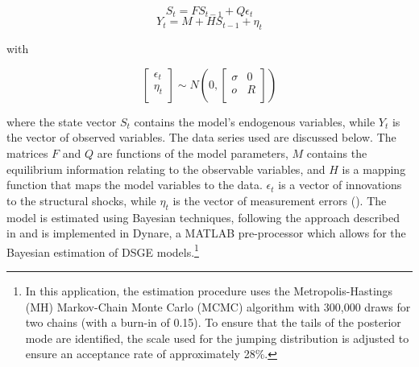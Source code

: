 \documentclass[a4paper,11pt]{article}
\numberwithin{equation}{section}
\begin{document}
	\begin{equation}
	S_t=FS_{t-1}+Q\epsilon_t
	\end{equation}
	\begin{equation}
	Y_t=M+HS_{t-1}+\eta_t
	\end{equation}
	
	with 
	
	\begin{equation} \label{measurement}
	\begin{bmatrix}
	\epsilon_t\\
	\eta_t\\
	\end{bmatrix}
	\sim
	N\left(
	0,
	\begin{bmatrix}
		\sigma & 0\\
		o & R\\
	\end{bmatrix}
	\right)
	\end{equation}
	
	where the state vector $S_t$ contains the model's endogenous variables, while $Y_t$ is the vector of observed variables. The data series used are discussed below. The matrices $F$ and $Q$ are functions of the model parameters, $M$ contains the equilibrium information relating to the observable variables, and $H$ is a mapping function that maps the model variables to the data. $\epsilon_t$ is a vector of innovations to the structural shocks, while $\eta_t$ is the vector of measurement errors (\citealp{steinbach2014}). The model is estimated using Bayesian techniques, following the approach described in \cite{an2007} and is implemented in Dynare, a MATLAB pre-processor which allows for the Bayesian estimation of DSGE models.\footnote{In this application, the estimation procedure uses the Metropolis-Hastings (MH) Markov-Chain Monte Carlo (MCMC) algorithm with 300,000 draws for two chains (with a burn-in of 0.15). To ensure that the tails of the posterior mode are identified, the scale used for the jumping distribution is adjusted to ensure an acceptance rate of approximately 28\%.} 
	
%	
%	
	
\end{document}
